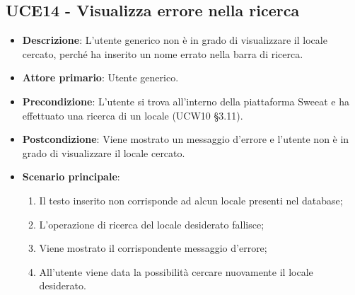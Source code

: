 \subsection{UCE14 - Visualizza errore nella ricerca}
\begin{itemize}
\item \textbf{Descrizione}: L'utente generico non è in grado di visualizzare il locale cercato, perché ha inserito un nome errato nella barra di ricerca.
\item \textbf{Attore primario}: Utente generico.
\item \textbf{Precondizione}: L'utente si trova all’interno della piattaforma Sweeat e ha effettuato una ricerca di un locale (UCW10 §3.11).
\item \textbf{Postcondizione}: Viene mostrato un messaggio d'errore e l'utente non è in grado di visualizzare il locale cercato.
\item \textbf{Scenario principale}:
\begin{enumerate}    
	\item Il testo inserito non corrisponde ad alcun locale presenti nel database;
	\item L'operazione di ricerca del locale desiderato fallisce;
	\item Viene mostrato il corrispondente messaggio d'errore;
	\item All'utente viene data la possibilità cercare nuovamente il locale desiderato.
\end{enumerate}
\end{itemize}